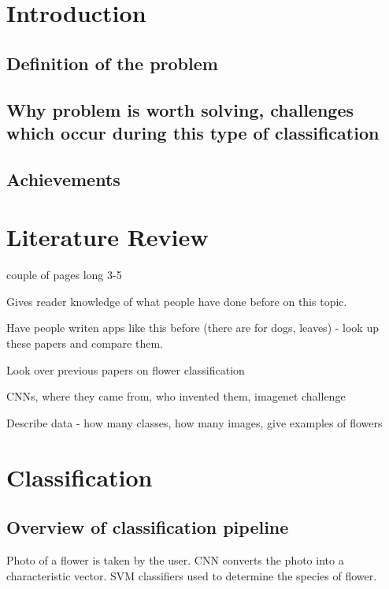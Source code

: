 \documentclass[11pt, a4paper]{report}
\begin{document}
\chapter{Introduction}

\section{Definition of the problem} 

\section{Why problem is worth solving, challenges which occur during this type of classification}

\section{Achievements}







\chapter{Literature Review}

couple of pages long 3-5

Gives reader knowledge of what people have done before on this topic. 

Have people writen apps like this before (there are for dogs, leaves) - look up these papers and compare them.

Look over previous papers on flower classification 

CNNs, where they came from, who invented them, imagenet challenge


Describe data - how many classes, how many images, give examples of flowers


\chapter{Classification}

\section{Overview of classification pipeline}
Photo of a flower is taken by the user. CNN converts the photo into a characteristic vector. SVM classifiers used to determine the species of flower. 
\end{document}
